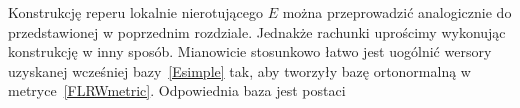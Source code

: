 Konstrukcję reperu lokalnie nierotującego $E$ można przeprowadzić 
analogicznie do przedstawionej w poprzednim rozdziale.
 Jednakże rachunki uprościmy wykonując konstrukcję w inny sposób. 
Mianowicie stosunkowo łatwo jest 
uogólnić wersory uzyskanej wcześniej bazy~\eqref{Esimple} tak, aby 
tworzyły bazę ortonormalną w metryce~\eqref{FLRWmetric}.
Odpowiednia baza jest postaci
